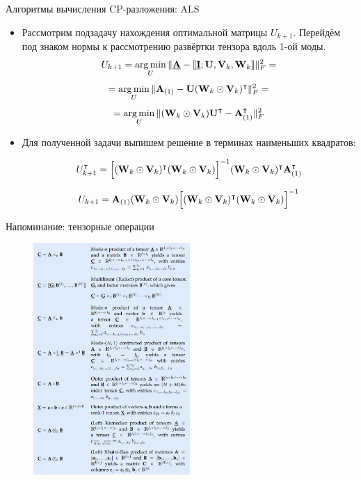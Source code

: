 
\begin{frame}{Алгоритмы вычисления CP-разложения: ALS}

\begin{itemize}
    \item Рассмотрим подзадачу нахождения оптимальной матрицы $U_{k+1}$. Перейдём под знаком нормы к рассмотрению развёртки тензора вдоль 1-ой моды.
    $$ \displaystyle U_{k+1} = \operatorname*{arg\,min}_{U}{\lVert \underline{\textbf{A}} - \llbracket \underline{\textbf{I}} ; \textbf{U}, \textbf{V}_k,  \textbf{W}_k \rrbracket \rVert_F^2} = $$ $$ = \operatorname*{arg\,min}_{U}{\lVert \textbf{A}_{(1)} -  \textbf{U} (\textbf{W}_k \odot \textbf{V}_k)^\intercal \rVert_F^2 } = $$ $$ = \operatorname*{arg\,min}_{U}{\lVert (\textbf{W}_k \odot \textbf{V}_k) \textbf{U}^\intercal - \textbf{A}_{(1)}^\intercal \rVert_F^2 }$$
    \item Для полученной задачи выпишем решение в терминах наименьших квадратов:

    $$ U_{k+1}^\intercal = \Big[(\textbf{W}_k \odot \textbf{V}_k)^\intercal (\textbf{W}_k \odot \textbf{V}_k)\Big]^{-1} (\textbf{W}_k \odot \textbf{V}_k)^\intercal \textbf{A}_{(1)}^\intercal $$

    $$ U_{k+1} = \textbf{A}_{(1)} (\textbf{W}_k \odot \textbf{V}_k) \Big[(\textbf{W}_k \odot \textbf{V}_k)^\intercal (\textbf{W}_k \odot \textbf{V}_k)\Big]^{-1}$$
\end{itemize}




\end{frame}


\begin{frame}{Напоминание: тензорные операции}

\begin{figure}
    \centering
    \includegraphics[width=0.53\textwidth]{lecture_11/figs/tensor_operations.png}
\end{figure}

\end{frame}


